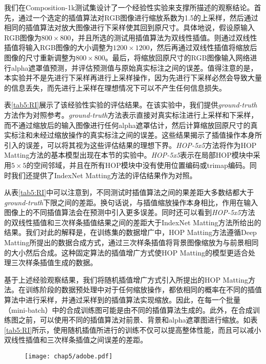 我们在Composition-1k测试集\cite{xu2017deep}设计了一个经验性实验来支撑所描述的观察结论。首先，通过一个选定的插值算法对RGB图像进行缩放系数为1.5的上采样，然后通过相同的插值算法对放大图像进行下采样使其回到原尺寸。具体地说，假设原输入RGB图像为$800 \times 800$，并且所选的测试用插值算法为双线性插值。则通过双线性插值将输入RGB图像的大小调整为$1200 \times 1200$，然后再通过双线性插值将缩放后图像的尺寸重新调整为$800\times 800$。最后，将缩放回原尺寸的RGB图像输入网络进行alpha遮罩值预测，并评估预测值与原始真实标注之间的误差。值得注意的是，本实验并不是先进行下采样再进行上采样操作，因为先进行下采样必然会导致大量的信息丢失，而先进行上采样在理想情况下可以不产生任何信息损失。


表\ref{tab5:RI}展示了该经验性实验的评估结果。在该实验中，我们提供\textit{ground-truth}方法作为对照参考。\textit{ground-truth}方法表示直接对真实标注进行上采样和下采样，而不通过缩放后的输入图像进行任何alpha遮罩估计，然后计算缩放回原尺寸的真实标注和未经过缩放操作的真实标注之间的误差。这些结果揭示了插值操作本身所引入的误差，可以将其视为这些评估结果的理想下界。\textit{HOP-5x5}方法将作为HOP Matting方法的基本模型出现在本节的实验中。\textit{HOP-5x5}表示在局部HOP模块中采用$5\times 5$的空间邻域，并且在所有HOP模块中没有使用位置编码或trimap编码。同时我们还提供了IndexNet Matting\cite{lu2019indices}方法的评估结果作为对照。

从表\ref{tab5:RI}中可以注意到，不同测试时插值算法之间的果差距大多数结都大于\textit{ground-truth}下限之间的差距。换句话说，与插值缩放操作本身相比，作用在输入图像上的不同插值算法会在预测中引入更多误差。同时还可以看到\textit{HOP-5x5}方法的双线性插值和三次样条插值结果之间的差距大于IndexNet Matting\cite{lu2019indices}方法所给出的结果。我们对此的解释是，在训练集的数据增广中，HOP Matting方法遵循Deep Matting\cite{xu2017deep}所提出的数据合成方式，通过三次样条插值将背景图像缩放为与前景相同的大小然后合成。这种固定算法的插值增广方式使HOP Matting的模型更适合处理三次样条插值生成的数据。

基于上述经验观察结果，我们将随机插值增广方式引入所提出的HOP Matting方法。在训练阶段的数据预处理中对于任何缩放操作，都依相同的概率在不同的插值算法中进行采样，并通过采样到的插值算法实现缩放。因此，在每一个批量（mini-batch）中的合成训练图可能是由不同的插值算法生成的。此外，在合成训练图之前，可以使用不同的插值算法对前景、背景和alpha遮罩图进行缩放。如表\ref{tab5:RI}所示，使用随机插值所进行的训练不仅可以提高整体性能，而且可以减小双线性插值和三次样条插值之间误差的差距。

\begin{figure}[t]
	\centering
	\texttt{[image: chap5/adobe.pdf]}
	\label{fig5:adobe}
\end{figure}

